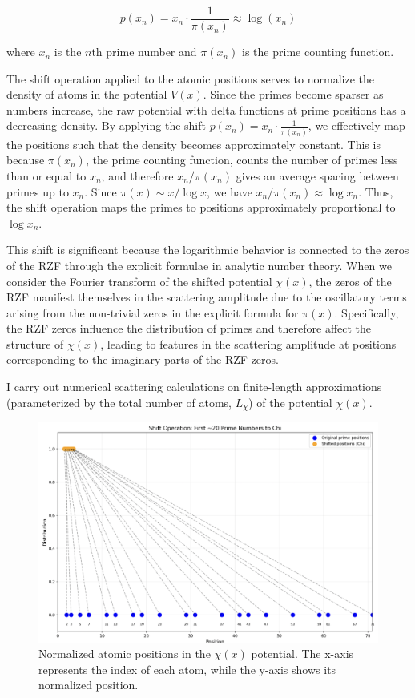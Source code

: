 \documentclass[11pt, oneside]{article}
\begin{document}
\begin{equation}
p(x_n) = x_n \cdot \frac{1}{\pi(x_n)} \approx \log(x_n)
\end{equation}

where $x_n$ is the $n$th prime number and $\pi(x_n)$ is the prime counting function.

The shift operation applied to the atomic positions serves to normalize the density of atoms in the potential $V(x)$. Since the primes become sparser as numbers increase, the raw potential with delta functions at prime positions has a decreasing density. By applying the shift $p(x_n) = x_n \cdot \frac{1}{\pi(x_n)}$, we effectively map the positions such that the density becomes approximately constant. This is because $\pi(x_n)$, the prime counting function, counts the number of primes less than or equal to $x_n$, and therefore $x_n / \pi(x_n)$ gives an average spacing between primes up to $x_n$. Since $\pi(x) \sim x / \log x$, we have $x_n / \pi(x_n) \approx \log x_n$. Thus, the shift operation maps the primes to positions approximately proportional to $\log x_n$.

This shift is significant because the logarithmic behavior is connected to the zeros of the RZF through the explicit formulae in analytic number theory. When we consider the Fourier transform of the shifted potential $\chi(x)$, the zeros of the RZF manifest themselves in the scattering amplitude due to the oscillatory terms arising from the non-trivial zeros in the explicit formula for $\pi(x)$. Specifically, the RZF zeros influence the distribution of primes and therefore affect the structure of $\chi(x)$, leading to features in the scattering amplitude at positions corresponding to the imaginary parts of the RZF zeros.

I carry out numerical scattering calculations on finite-length approximations (parameterized by the total number of atoms, $L_{\chi}$) of the potential $\chi(x)$.

\begin{figure}[htbp]
\begin{center}
    \includegraphics[width=0.8\linewidth]{../images/normalizing.png}
\caption{Normalized atomic positions in the $\chi(x)$ potential. The x-axis represents the index of each atom, while the y-axis shows its normalized position.}
\label{fig:normalized_positions}
\end{center}
\end{figure}
\end{document}
